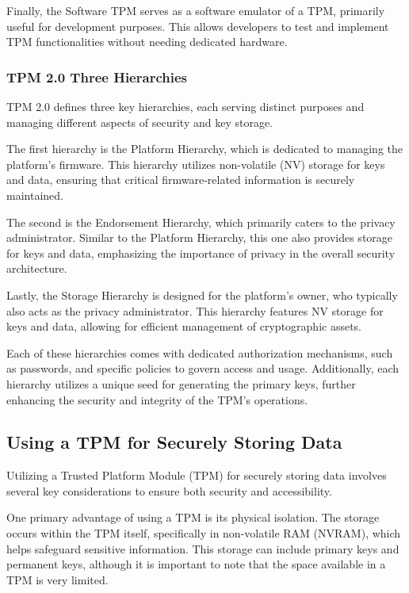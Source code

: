 Finally, the Software TPM serves as a software emulator of a TPM,
primarily useful for development purposes. This allows developers to
test and implement TPM functionalities without needing dedicated
hardware.

\subsubsection{TPM 2.0 Three Hierarchies}

TPM 2.0 defines three key hierarchies, each serving distinct purposes
and managing different aspects of security and key storage.

The first hierarchy is the Platform Hierarchy, which is dedicated to
managing the platform’s firmware. This hierarchy utilizes non-volatile
(NV) storage for keys and data, ensuring that critical
firmware-related information is securely maintained.

The second is the Endorsement Hierarchy, which primarily caters to the
privacy administrator. Similar to the Platform Hierarchy, this one
also provides storage for keys and data, emphasizing the importance of
privacy in the overall security architecture.

Lastly, the Storage Hierarchy is designed for the platform’s owner,
who typically also acts as the privacy administrator. This hierarchy
features NV storage for keys and data, allowing for efficient
management of cryptographic assets.

Each of these hierarchies comes with dedicated authorization
mechanisms, such as passwords, and specific policies to govern access
and usage. Additionally, each hierarchy utilizes a unique seed for
generating the primary keys, further enhancing the security and
integrity of the TPM's operations.

\subsection{Using a TPM for Securely Storing Data}

Utilizing a Trusted Platform Module (TPM) for securely storing data
involves several key considerations to ensure both security and
accessibility.

One primary advantage of using a TPM is its physical isolation. The
storage occurs within the TPM itself, specifically in non-volatile RAM
(NVRAM), which helps safeguard sensitive information. This storage can
include primary keys and permanent keys, although it is important to
note that the space available in a TPM is very limited.

